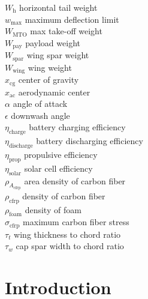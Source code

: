 \documentclass[]{aiaa-tc}%
\begin{document}
\begin{multicols}{2}
\begin{tabbing}
$W_{\text{h}}$ \> horizontal tail weight \\ %
$w_{\text{max}}$ \> maximum deflection limit \\ %
$W_{\text{MTO}}$\> max take-off weight \\ %
$W_{\text{pay}}$ \> payload weight \\ %
$W_{\text{spar}}$ \> wing spar weight \\ %
$W_{\text{wing}}$ \> wing weight \\ %
$x_{\mathrm{cg}}$ \> center of gravity \\
$x_{\mathrm{ac}}$ \> aerodynamic center \\
$\alpha$ \> angle of attack \\
$\epsilon$ \> downwash angle \\
$\eta_{\text{charge}}$ \> battery charging efficiency \\
$\eta_{\text{discharge}}$ \> battery discharging efficiency \\
$\eta_{\text{prop}}$ \> propulsive efficiency \\
$\eta_{\text{solar}}$ \> solar cell efficiency \\
$\rho_{A_{\text{cfrp}}}$ \> area density of carbon fiber \\ %
$\rho_{\text{cfrp}}$ \> density of carbon fiber \\ %
$\rho_{\text{foam}}$ \> density of foam \\ %
$\sigma_{\text{cfrp}}$ \> maximum carbon fiber stress \\ %
$\tau_t$ \> wing thickness to chord ratio \\
$\tau_w$ \> cap spar width to chord ratio \\
 \end{tabbing}

\end{multicols}

\section{Introduction}
\end{document}
